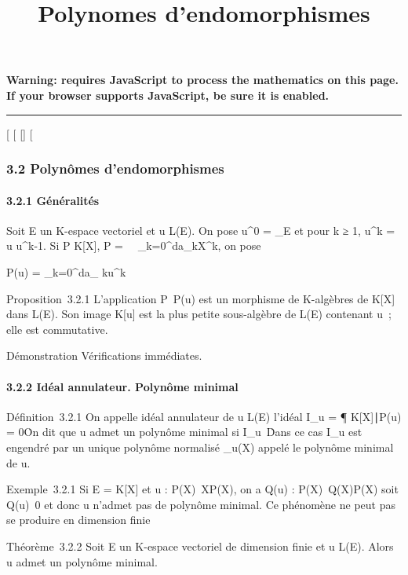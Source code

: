 \documentclass[]{article}
\title{Polynomes d'endomorphismes}
\author{}
\date{}
\begin{document}
\maketitle

\textbf{Warning: 
requires JavaScript to process the mathematics on this page.\\ If your
browser supports JavaScript, be sure it is enabled.}

\begin{center}\rule{3in}{0.4pt}\end{center}

{[}
{[}
{[}{]}
{[}

\subsubsection{3.2 Polynômes d'endomorphismes}

\paragraph{3.2.1 Généralités}

Soit E un K-espace vectoriel et u \in L(E). On pose u^0 =
\mathrmId_E et pour k ≥ 1, u^k = u
\cdot u^k-1. Si P \in K{[}X{]}, P =\
\sum ~
_k=0^da_kX^k, on pose

P(u) = \sum _k=0^da_
ku^k

Proposition~3.2.1 L'application P\mapsto~P(u) est un
morphisme de K-algèbres de K{[}X{]} dans L(E). Son image K{[}u{]} est la
plus petite sous-algèbre de L(E) contenant u~; elle est commutative.

Démonstration Vérifications immédiates.

\paragraph{3.2.2 Idéal annulateur. Polynôme minimal}

Définition~3.2.1 On appelle idéal annulateur de u \in L(E) l'idéal
I_u = \P \in
K{[}X{]}∣P(u) = 0\. On dit
que u admet un polynôme minimal si
I_u\neq~\0\.
Dans ce cas I_u est engendré par un unique polynôme normalisé
\mu_u(X) appelé le polynôme minimal de u.

Exemple~3.2.1 Si E = K{[}X{]} et u :
P(X)\mapsto~XP(X), on a Q(u) :
P(X)\mapsto~Q(X)P(X) soit
Q(u)\neq~0 et donc u n'admet pas de polynôme
minimal. Ce phénomène ne peut pas se produire en dimension finie

Théorème~3.2.2 Soit E un K-espace vectoriel de dimension finie et u \in
L(E). Alors u admet un polynôme minimal.
\end{document}

